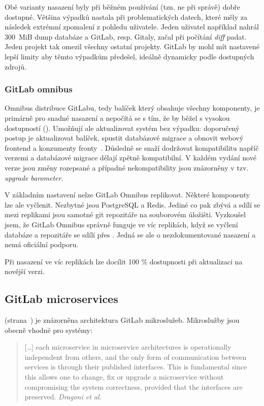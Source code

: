         Obě varianty nasazení byly při běžném používání (tzn. ne při správě) dobře dostupné. Většina výpadků nastala při problematických datech, které měly za následek extrémní zpomalení z pohledu uživatele. Jeden uživatel například nahrál $300$~MiB dump databáze a GitLab, resp. Gitaly, začal při počítání \textit{diff} padat. Jeden projekt tak omezil všechny ostatní projekty. GitLab by mohl mít nastavené lepší limity aby těmto výpadkům předešel, ideálně dynamicky podle dostupných zdrojů.

        \subsubsection{GitLab omnibus}
            Omnibus distribuce GitLabu, tedy balíček který obsahuje všechny komponenty, je primárně pro snadné nasazení a nepočítá se s tím, že by běžel s vysokou dostupností (\HA). Umožňují ale aktualizovat systém bez výpadku: doporučený postup je aktualizovat balíček, spustit databázové migrace a obnovit webový frontend a konzumenty fronty~\cite{gitlab-omnibus-update}. Důsledně se snaží dodržovat kompatibilitu napříč verzemi a databázové migrace dělají zpětně kompatibilní. V každém vydání nové verze jsou změny rozepsané a případné nekompatibility jsou znázorněny v tzv. \textit{upgrade barometer}.

            V základním nastavení nelze GitLab Omnibus replikovat. Některé komponenty lze ale vyčlenit. Nezbytné jsou PostgreSQL a Redis. Jediné co pak zbývá a sdílí se mezi replikami jsou samotné git repozitáře na souborovém úložišti. Vyzkoušel jsem, že GitLab Omnibus správně funguje ve víc replikách, když se vyčlení databáze a repozitáře se sdílí přes . Jedná se ale o nezdokumentované nasazení a nemá oficiální podporu.

            Při nasazení ve víc replikách lze docílit 100 \% dostupnosti při aktualizaci na novější verzi.

        \subsection{GitLab microservices}
             (strana~\pageref{pic:gitlab-architecture}) je znázorněna architektura GitLab mikroslužeb. Mikroslužby jsou obecně vhodné pro  systémy:

            \begin{quote}
                [\ldots] each microservice in microservice architectures is operationally independent from others, and the only form of communication between services is through their published interfaces. This is fundamental since this allows one to change, fix or upgrade a microservice without compromising the system correctness, provided that the interfaces are preserved. \textit{Dragoni et al.~\cite{dragoni-microservices}}
            \end{quote}


